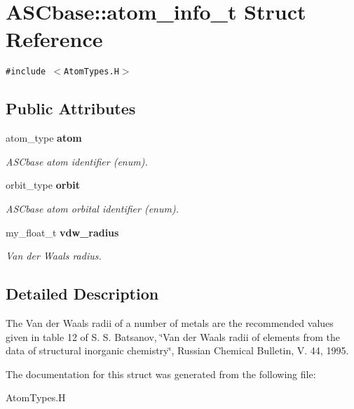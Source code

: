 \section{ASCbase::atom\_\-info\_\-t Struct Reference}
\label{structASCbase_1_1atom__info__t}
{\tt \#include $<$Atom\-Types.H$>$}

\subsection*{Public Attributes}
\begin{CompactItemize}
\item 
atom\_\-type \bf{atom}\label{structASCbase_1_1atom__info__t_3a8ad1a87e0f8c0e9e20c6b7a3b53e51}

\begin{CompactList}\small\item\em ASCbase atom identifier (enum). \item\end{CompactList}\item 
orbit\_\-type \bf{orbit}\label{structASCbase_1_1atom__info__t_fcebe437b571a4ac9ff7b4dfa319b1d7}

\begin{CompactList}\small\item\em ASCbase atom orbital identifier (enum). \item\end{CompactList}\item 
my\_\-float\_\-t \bf{vdw\_\-radius}\label{structASCbase_1_1atom__info__t_1d6e93f1fc9c78af5bec80786d7560f6}

\begin{CompactList}\small\item\em Van der Waals radius. \item\end{CompactList}\end{CompactItemize}


\subsection{Detailed Description}
The Van der Waals radii of a number of metals are the recommended values given in table 12 of S. S. Batsanov, \char`\"{}Van der Waals radii of elements from the data of structural inorganic chemistry\char`\"{}, Russian Chemical Bulletin, V. 44, 1995. 



The documentation for this struct was generated from the following file:\begin{CompactItemize}
\item 
Atom\-Types.H\end{CompactItemize}
